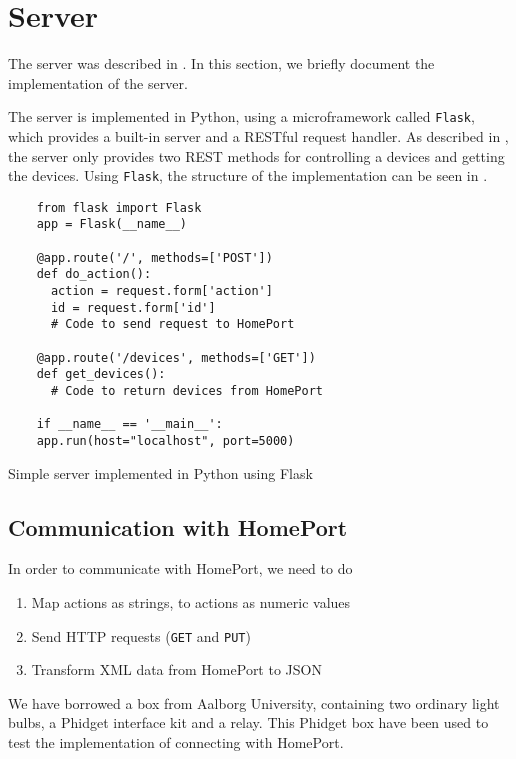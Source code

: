 \section{Server}\label{sec:serverimplementation}
The server was described in . 
In this section, we briefly document the implementation of the server.

The server is implemented in Python,
using a microframework called \texttt{Flask},
which provides a built-in server and a RESTful request handler. 
As described in , 
the server only provides two REST methods for controlling a devices and getting the devices. 
Using \texttt{Flask}, the structure of the implementation can be seen in .

\begin{listing}
  \begin{verbatim}
    from flask import Flask
    app = Flask(__name__)
    
    @app.route('/', methods=['POST'])
    def do_action():
      action = request.form['action']
      id = request.form['id']
      # Code to send request to HomePort
      
    @app.route('/devices', methods=['GET'])
    def get_devices():
      # Code to return devices from HomePort
    
    if __name__ == '__main__':
    app.run(host="localhost", port=5000)
  \end{verbatim}
  \caption{Simple server implemented in Python using Flask}
  \label{lst:server}
\end{listing}

\subsection{Communication with HomePort}
In order to communicate with HomePort, 
we need to do
\begin{enumerate}
  \item Map actions as strings, to actions as numeric values
  \item Send HTTP requests (\texttt{GET} and \texttt{PUT})
  \item Transform XML data from HomePort to JSON
\end{enumerate}

We have borrowed a box from Aalborg University,
containing two ordinary light bulbs, 
a Phidget interface kit and a relay.
This Phidget box have been used to test the implementation of connecting with HomePort. 

